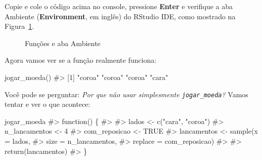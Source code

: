 \documentclass[
  letterpaper,
]{book}
\newenvironment{Shaded}{\begin{snugshade}}{\end{snugshade}}
\newcommand{\CommentTok}[1]{\textcolor[rgb]{0.37,0.37,0.37}{#1}}
\newcommand{\FunctionTok}[1]{\textcolor[rgb]{0.28,0.35,0.67}{#1}}
\newcommand{\NormalTok}[1]{\textcolor[rgb]{0.00,0.23,0.31}{#1}}
\theoremstyle{definition}
\theoremstyle{plain}
\theoremstyle{remark}
\begin{document}
Copie e cole o código acima no console, pressione \textbf{Enter} e
verifique a aba Ambiente (\textbf{Environment}, em inglês) do RStudio
IDE, como mostrado na Figura~\ref{fig-running-toss-coin}.

\begin{figure}


\caption{\label{fig-running-toss-coin}Funções e aba Ambiente}

\end{figure}%

Agora vamos ver se a função realmente funciona:

\begin{Shaded}
\begin{Highlighting}[]
\FunctionTok{jogar\_moeda}\NormalTok{()}
\CommentTok{\#\textgreater{} [1] "coroa" "coroa" "coroa" "cara"}
\end{Highlighting}
\end{Shaded}

Você pode se perguntar: \emph{Por que não usar simplesmente
\texttt{jogar\_moeda}?} Vamos tentar e ver o que acontece:

\begin{Shaded}
\begin{Highlighting}[]
\NormalTok{jogar\_moeda}
\CommentTok{\#\textgreater{} function() \{}
\CommentTok{\#\textgreater{}   }
\CommentTok{\#\textgreater{}   lados \textless{}{-} c("cara", "coroa")}
\CommentTok{\#\textgreater{}   n\_lancamentos \textless{}{-} 4}
\CommentTok{\#\textgreater{}   com\_reposicao \textless{}{-} TRUE}
\CommentTok{\#\textgreater{}   lancamentos \textless{}{-} sample(x = lados, }
\CommentTok{\#\textgreater{}                         size = n\_lancamentos, }
\CommentTok{\#\textgreater{}                         replace = com\_reposicao)}
\CommentTok{\#\textgreater{}   }
\CommentTok{\#\textgreater{}   return(lancamentos)}
\CommentTok{\#\textgreater{} \}}
\end{Highlighting}
\end{Shaded}
\end{document}
